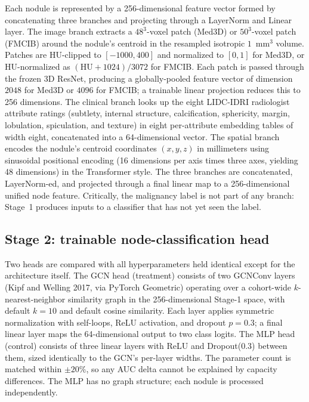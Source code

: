 \documentclass[10pt,letterpaper,twocolumn]{article}
\begin{document}
Each nodule is represented by a 256-dimensional feature vector formed by concatenating three branches and projecting through a LayerNorm and Linear layer. The image branch extracts a $48^3$-voxel patch (Med3D) or $50^3$-voxel patch (FMCIB) around the nodule's centroid in the resampled isotropic $1$~mm$^3$ volume. Patches are HU-clipped to $[-1000, 400]$ and normalized to $[0, 1]$ for Med3D, or HU-normalized as $(\mathrm{HU} + 1024)/3072$ for FMCIB. Each patch is passed through the frozen 3D ResNet, producing a globally-pooled feature vector of dimension $2048$ for Med3D or $4096$ for FMCIB; a trainable linear projection reduces this to 256 dimensions. The clinical branch looks up the eight LIDC-IDRI radiologist attribute ratings (subtlety, internal structure, calcification, sphericity, margin, lobulation, spiculation, and texture) in eight per-attribute embedding tables of width eight, concatenated into a 64-dimensional vector. The spatial branch encodes the nodule's centroid coordinates $(x, y, z)$ in millimeters using sinusoidal positional encoding (16 dimensions per axis times three axes, yielding 48 dimensions) in the Transformer style. The three branches are concatenated, LayerNorm-ed, and projected through a final linear map to a 256-dimensional unified node feature. Critically, the malignancy label is not part of any branch: Stage~1 produces inputs to a classifier that has not yet seen the label.

\subsection{Stage 2: trainable node-classification head}

Two heads are compared with all hyperparameters held identical except for the architecture itself. The GCN head (treatment) consists of two GCNConv layers (Kipf and Welling 2017, via PyTorch Geometric) operating over a cohort-wide $k$-nearest-neighbor similarity graph in the 256-dimensional Stage-1 space, with default $k = 10$ and default cosine similarity. Each layer applies symmetric normalization with self-loops, ReLU activation, and dropout $p = 0.3$; a final linear layer maps the 64-dimensional output to two class logits. The MLP head (control) consists of three linear layers with ReLU and Dropout(0.3) between them, sized identically to the GCN's per-layer widths. The parameter count is matched within $\pm 20\%$, so any AUC delta cannot be explained by capacity differences. The MLP has no graph structure; each nodule is processed independently.
\end{document}
